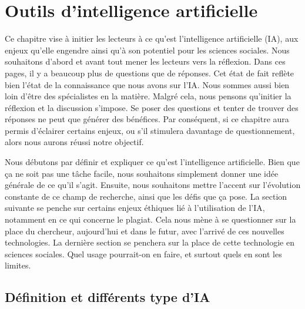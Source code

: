 \documentclass[
  letterpaper,
]{scrbook}
\begin{document}

\hypertarget{outils-dintelligence-artificielle}{%
\chapter{Outils d'intelligence
artificielle}\label{outils-dintelligence-artificielle}}

Ce chapitre vise à initier les lecteurs à ce qu'est l'intelligence
artificielle (IA), aux enjeux qu'elle engendre ainsi qu'à son potentiel
pour les sciences sociales. Nous souhaitons d'abord et avant tout mener
les lecteurs vers la réflexion. Dans ces pages, il y a beaucoup plus de
questions que de réponses. Cet état de fait reflète bien l'état de la
connaissance que nous avons sur l'IA. Nous sommes aussi bien loin d'être
des spécialistes en la matière. Malgré cela, nous pensons qu'initier la
réflexion et la discussion s'impose. Se poser des questions et tenter de
trouver des réponses ne peut que générer des bénéfices. Par conséquent,
si ce chapitre aura permis d'éclairer certains enjeux, ou s'il stimulera
davantage de questionnement, alors nous aurons réussi notre objectif.

Nous débutons par définir et expliquer ce qu'est l'intelligence
artificielle. Bien que ça ne soit pas une tâche facile, nous souhaitons
simplement donner une idée générale de ce qu'il s'agit. Ensuite, nous
souhaitons mettre l'accent sur l'évolution constante de ce champ de
recherche, ainsi que les défis que ça pose. La section suivante se
penche sur certains enjeux éthiques lié à l'utilisation de l'IA,
notamment en ce qui concerne le plagiat. Cela nous mène à se questionner
sur la place du chercheur, aujourd'hui et dans le futur, avec l'arrivé
de ces nouvelles technologies. La dernière section se penchera sur la
place de cette technologie en sciences sociales. Quel usage pourrait-on
en faire, et surtout quels en sont les limites.

\hypertarget{duxe9finition-et-diffuxe9rents-type-dia}{%
\section{Définition et différents type
d'IA}\label{duxe9finition-et-diffuxe9rents-type-dia}}
\end{document}
